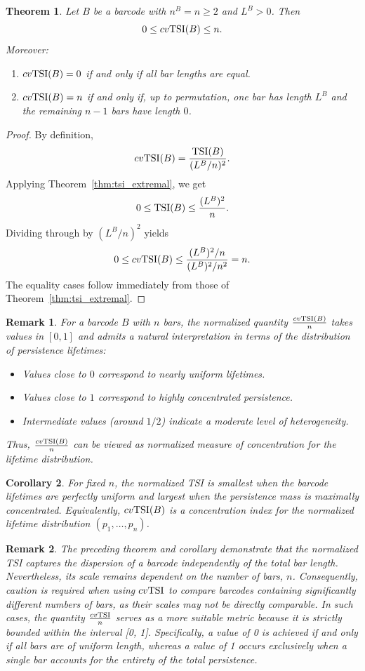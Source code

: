 \documentclass[11pt]{amsart}
\newtheorem*{remark}{Remark}
\newtheorem{theorem}{Theorem}[section]
\newtheorem{corollary}[theorem]{Corollary}
\theoremstyle{definition}
\newcommand{\tsi}[0]{\textup{TSI}}
\begin{document}
\begin{theorem}\label{thm:cvtsi_bounds}
Let $B$ be a barcode with $n^B=n\geq 2$ and $L^B>0$. Then
\[
0\leq cv\tsi(B)\leq n.
\]
Moreover:
\begin{enumerate}
    \item $cv\tsi(B)=0$ if and only if all bar lengths are equal.
    \item $cv\tsi(B)=n$ if and only if, up to permutation, one bar has length $L^B$ and the remaining $n-1$ bars have length $0$.
\end{enumerate}
\end{theorem}

\begin{proof}
By definition,
\[
cv\tsi(B)=\frac{\tsi(B)}{(L^B/n)^2}.
\]
Applying Theorem~\ref{thm:tsi_extremal}, we get
\[
0\leq \tsi(B)\leq \frac{(L^B)^2}{n}.
\]
Dividing through by $(L^B/n)^2$ yields
\[
0\leq cv\tsi(B)\leq \frac{(L^B)^2/n}{(L^B)^2/n^2}=n.
\]
The equality cases follow immediately from those of Theorem~\ref{thm:tsi_extremal}.
\end{proof}


\begin{remark}\rm
For a barcode $B$ with $n$ bars, the normalized quantity $\frac{cv\tsi(B)}{n}$ takes values in $[0,1]$ and admits a natural interpretation in terms of the distribution of persistence lifetimes:
\begin{itemize}
    \item[-] Values close to $0$ correspond to nearly uniform lifetimes. 
    \item[-] Values close to $1$ correspond to highly concentrated persistence.
    \item[-] Intermediate values (around $1/2$) indicate a moderate level of heterogeneity.
\end{itemize}
Thus, $\frac{cv\tsi(B)}{n}$ can be viewed as normalized measure of concentration for the lifetime distribution. 
\end{remark}


\begin{corollary}
For fixed $n$, the normalized TSI is smallest when the barcode lifetimes are perfectly uniform and largest when the persistence mass is maximally concentrated. Equivalently, $cv\tsi(B)$ is a concentration index for the normalized lifetime distribution $(p_1,\dots,p_n)$.
\end{corollary}

\begin{remark}\rm 
    The preceding theorem and corollary demonstrate that the normalized TSI captures the dispersion of a barcode independently of the total bar length. Nevertheless, its scale remains dependent on the number of bars, $n$. Consequently, caution is required when using $cv\tsi$ to compare barcodes containing significantly different numbers of bars, as their scales may not be directly comparable. In such cases, the quantity $\frac{cv\tsi}{n}$ serves as a more suitable metric because it is strictly bounded within the interval [0, 1]. Specifically, a value of 0 is achieved if and only if all bars are of uniform length, whereas a value of 1 occurs exclusively when a single bar accounts for the entirety of the total persistence.
\end{remark}
\end{document}
